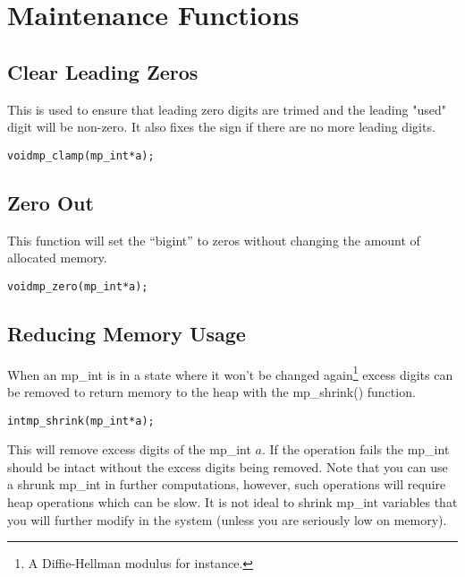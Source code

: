 \documentclass[synpaper]{book}
\begin{document}
\section{Maintenance Functions}
\subsection{Clear Leading Zeros}

This is used to ensure that leading zero digits are trimed and the leading "used" digit will be non-zero.
It also fixes the sign if there are no more leading digits.

\begin{alltt}
void mp_clamp(mp_int *a);
\end{alltt}

\subsection{Zero Out}

This function will set the ``bigint'' to zeros without changing the amount of allocated memory.

\begin{alltt}
void mp_zero(mp_int *a);
\end{alltt}


\subsection{Reducing Memory Usage}
When an mp\_int is in a state where it won't be changed again\footnote{A Diffie-Hellman modulus for instance.} excess
digits can be removed to return memory to the heap with the mp\_shrink() function.

\begin{alltt}
int mp_shrink (mp_int * a);
\end{alltt}

This will remove excess digits of the mp\_int $a$.  If the operation fails the mp\_int should be intact without the
excess digits being removed.  Note that you can use a shrunk mp\_int in further computations, however, such operations
will require heap operations which can be slow.  It is not ideal to shrink mp\_int variables that you will further
modify in the system (unless you are seriously low on memory).
\end{document}
